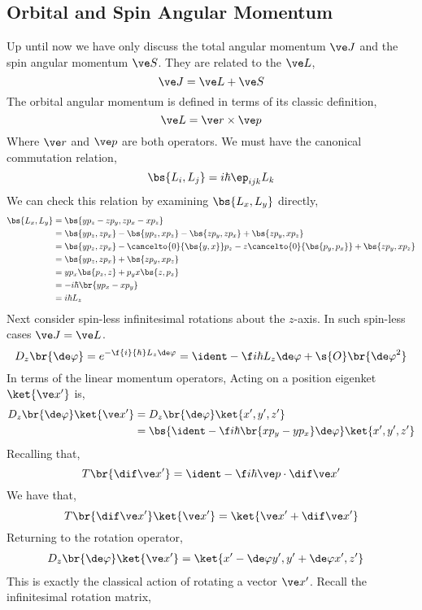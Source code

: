 \documentclass{article}
\begin{document}
\subsection{Orbital and Spin Angular Momentum}
Up until now we have only discuss the total angular momentum $\ve J$ and the spin angular momentum $\ve S$. They are related to the  $\ve L$,
\[ \ve J = \ve L + \ve S \]
The orbital angular momentum is defined in terms of its classic definition,
\[ \ve L = \ve r \times \ve p \]
Where $\ve r$ and $\ve p$ are both operators. We must have the canonical commutation relation,
\[ \bs{L_i, L_j} = i\hbar \ep_{ijk}L_k \]
We can check this relation by examining $\bs{L_x, L_y}$ directly,
\begin{align*}
    \bs{L_x, L_y}
    &= \bs{y p_z - z p_y, zp_x - x p_z} \\
    &= \bs{y p_z, zp_x} - \bs{y p_z, xp_z} - \bs{z p_y, zp_x} + \bs{z p_y, xp_z}\\
    &= \bs{y p_z, zp_x} - \cancelto{0}{\bs{y, x}}p_z - z\cancelto{0}{\bs{ p_y, p_x}} + \bs{z p_y, xp_z}\\
    &= \bs{y p_z, zp_x} + \bs{z p_y, xp_z}\\
    &= yp_x\bs{p_z, z} + p_y x \bs{z, p_z}\\
    &= -i\hbar \br{yp_x - xp_y}\\
    &= i \hbar L_z
\end{align*}
Next consider spin-less infinitesimal rotations about the $z$-axis. In such spin-less cases $\ve J = \ve L$.
\[ D_z \br{\de \varphi} = e^{- \f{i}{\hbar} L_z \de \varphi} = \ident - \f i \hbar L_z \de \varphi + \s{O}\br{{\de \varphi}^2} \]
In terms of the linear momentum operators,
Acting on a position eigenket $\ket{\ve x'}$ is,
\begin{align*}
D_z \br{\de \varphi}\ket{\ve x'}
&= D_z \br{\de \varphi}\ket{x', y', z'} \\
&= \bs{\ident - \f i \hbar \br{xp_y - yp_x}\de \varphi}\ket{x', y', z'}
\end{align*}
Recalling that,
\[ T\br{\dif \ve x'} = \ident - \f i \hbar \ve p \cdot \dif \ve x' \]
We have that,
\[ T\br{\dif \ve x'}\ket{\ve x'} = \ket{\ve x' + \dif \ve x'} \]
Returning to the rotation operator,
\begin{align*}
D_z \br{\de \varphi}\ket{\ve x'}
&= \ket{x' - \de \varphi y', y' + \de \varphi x', z'}
\end{align*}
This is exactly the classical action of rotating a vector $\ve x'$. Recall the infinitesimal rotation matrix,
\end{document}
